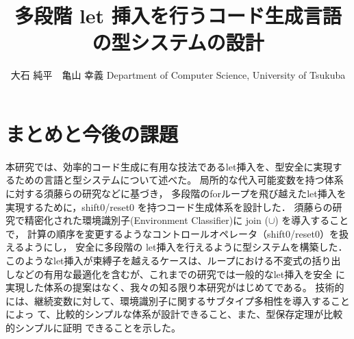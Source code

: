 \documentclass[T]{compsoft}
\theoremstyle{break}
\begin{document}
\title{多段階 let 挿入を行うコード生成言語の型システムの設計}

%
\author{大石 純平　亀山 幸義
%
%
%
%
%
{Department of Computer Science, University of Tsukuba}}


\maketitle \thispagestyle {empty}




%


\section{まとめと今後の課題}
本研究では、効率的コード生成に有用な技法であるlet挿入を、型安全に実現す
るための言語と型システムについて述べた。
局所的な代入可能変数を持つ体系に対する須藤らの研究\cite{Sudo2014}などに基づき，
多段階のforループを飛び越えたlet挿入を実現するために，shift0/reset0 を持つコード生成体系を設計した．
須藤らの研究で精密化された環境識別子(Environment Classifier)に join ($\cup$) を導入することで，
計算の順序を変更するようなコントロールオペレータ（shift0/reset0）を扱えるようにし，
安全に多段階の let挿入を行えるように型システムを構築した．
このようなlet挿入が束縛子を越えるケースは、ループにおける不変式の括り出
しなどの有用な最適化を含むが、これまでの研究では一般的なlet挿入を安全
に実現した体系の提案はなく、我々の知る限り本研究がはじめてである。
技術的には、継続変数に対して、環境識別子に関するサブタイプ多相性を導入することによっ
て、比較的シンプルな体系が設計できること、また、型保存定理が比較的シンプルに証明
できることを示した。
\end{document}
